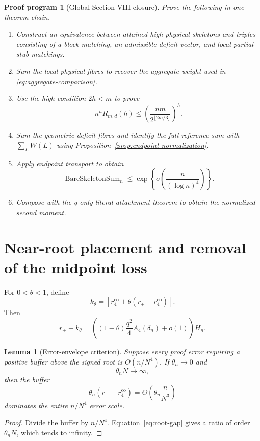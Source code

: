 \documentclass[11pt]{article}
\newtheorem{lemma}[theorem]{Lemma}
\newtheorem{program}[theorem]{Proof program}
\theoremstyle{definition}
\newcommand{\Afour}{A_4}
\newcommand{\rplus}{r_+}
\newcommand{\rco}{r_4^{\mathrm{co}}}
\begin{document}
\begin{program}[Global Section VIII closure]
Prove the following in one theorem chain.
\begin{enumerate}[label=(\roman*)]
\item Construct an equivalence between attained high physical skeletons and
triples consisting of a block matching, an admissible deficit vector, and
local partial stub matchings.
\item Sum the local physical fibres to recover the aggregate weight used in
\eqref{eq:aggregate-comparison}.
\item Use the high condition $2h<m$ to prove
\[
 n^hR_{m,d}(h)
 \le\left(\frac{nm}{2^{\lfloor2m/3\rfloor}}\right)^h.
\]
\item Sum the geometric deficit fibres and identify the full reference sum
with $\sum_LW(L)$ using Proposition~\ref{prop:endpoint-normalization}.
\item Apply endpoint transport to obtain
\[
 \operatorname{BareSkeletonSum}_n
 \le\exp\left\{o\left(\frac n{(\log n)^4}\right)\right\}.
\]
\item Compose with the q-only literal attachment theorem to obtain the
normalized second moment.
\end{enumerate}
\end{program}

\section{Near-root placement and removal of the midpoint loss}

For $0<\theta<1$, define
\[
 k_\theta
 =\left\lceil
 \rco+\theta(\rplus-\rco)
 \right\rceil.
\]
Then
\begin{equation}
 \rplus-k_\theta
 =\left((1-\theta)\frac{q^2}{4}\Afour(\delta_n)+o(1)\right)H_n.
 \label{eq:theta-gap}
\end{equation}

\begin{lemma}[Error-envelope criterion]
\label{lem:error-envelope}
Suppose every proof error requiring a positive buffer above the signed root is
$O(n/N^4)$.  If $\theta_n\to0$ and
\[
 \theta_nN\to\infty,
\]
then the buffer
\[
 \theta_n(\rplus-\rco)
 =\Theta\left(\theta_n\frac n{N^3}\right)
\]
dominates the entire $n/N^4$ error scale.
\end{lemma}

\begin{proof}
Divide the buffer by $n/N^4$.  Equation~\eqref{eq:root-gap} gives a ratio of
order $\theta_nN$, which tends to infinity.
\end{proof}
\end{document}
